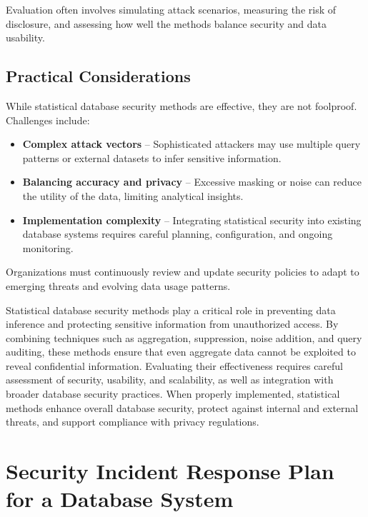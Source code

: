 \documentclass[12pt,a4paper]{article}
\begin{document}
Evaluation often involves simulating attack scenarios, measuring the risk of disclosure, and assessing how well the methods balance security and data usability.

\subsection{Practical Considerations}

While statistical database security methods are effective, they are not foolproof. Challenges include:

\begin{itemize}
  \item \textbf{Complex attack vectors} -- Sophisticated attackers may use multiple query patterns or external datasets to infer sensitive information.
  \item \textbf{Balancing accuracy and privacy} -- Excessive masking or noise can reduce the utility of the data, limiting analytical insights.
  \item \textbf{Implementation complexity} -- Integrating statistical security into existing database systems requires careful planning, configuration, and ongoing monitoring.
\end{itemize}

Organizations must continuously review and update security policies to adapt to emerging threats and evolving data usage patterns.

\begin{conclusion}
Statistical database security methods play a critical role in preventing data inference and protecting sensitive information from unauthorized access. By combining techniques such as aggregation, suppression, noise addition, and query auditing, these methods ensure that even aggregate data cannot be exploited to reveal confidential information. Evaluating their effectiveness requires careful assessment of security, usability, and scalability, as well as integration with broader database security practices. When properly implemented, statistical methods enhance overall database security, protect against internal and external threats, and support compliance with privacy regulations.
\end{conclusion}


\section{Security Incident Response Plan for a Database System}
\end{document}
